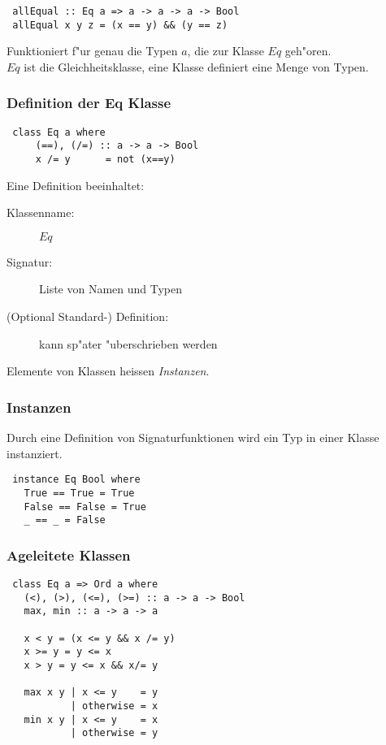 \documentclass[german,10pt, a4paper, twocolumn]{scrartcl}
\theoremstyle{definition}
\theoremstyle{remark}
\begin{document}
\begin{verbatim}
 allEqual :: Eq a => a -> a -> a -> Bool
 allEqual x y z = (x == y) && (y == z)
\end{verbatim}

Funktioniert f"ur genau die Typen $a$, die zur Klasse $Eq$ geh"oren.\\

$Eq$ ist die Gleichheitsklasse, eine Klasse definiert eine Menge von Typen.

\subsubsection{Definition der Eq Klasse}

\begin{verbatim}
 class Eq a where
     (==), (/=) :: a -> a -> Bool
     x /= y      = not (x==y)
\end{verbatim}

Eine Definition beeinhaltet:
\begin{description}
	\item[Klassenname:] $Eq$
	\item[Signatur:]Liste von Namen und Typen
	\item[(Optional Standard-) Definition:] kann sp"ater "uberschrieben werden
\end{description}

Elemente von Klassen heissen \textit{Instanzen}.

\subsubsection{Instanzen}

Durch eine Definition von Signaturfunktionen wird ein Typ in einer Klasse instanziert.

\begin{verbatim}
 instance Eq Bool where
   True == True = True
   False == False = True
   _ == _ = False
\end{verbatim}

\subsubsection{Ageleitete Klassen}

\begin{verbatim}
 class Eq a => Ord a where
   (<), (>), (<=), (>=) :: a -> a -> Bool
   max, min :: a -> a -> a

   x < y = (x <= y && x /= y)
   x >= y = y <= x
   x > y = y <= x && x/= y

   max x y | x <= y    = y
           | otherwise = x
   min x y | x <= y    = x
           | otherwise = y
\end{verbatim}
\end{document}
